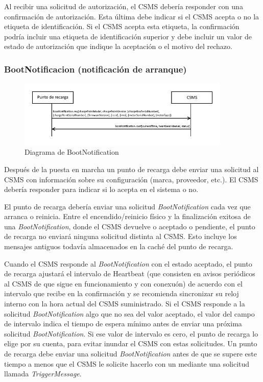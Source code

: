 \documentclass[12pt,a4paper,onecolumn,oneside]{report}
\begin{document}
Al recibir una solicitud de autorización, el CSMS debería responder con una confirmación de autorización. Esta última debe indicar si el CSMS acepta o no la etiqueta de identificación. Si el CSMS acepta esta etiqueta, la confirmación podría incluir una etiqueta de identificación superior y debe incluir un valor de estado de autorización que indique la aceptación o el motivo del rechazo.


\subsubsection{BootNotificacion (notificación de arranque)}
\label{BootNotificacion (notificación de arranque)}


\begin{figure}[H] 
\centering
  \includegraphics[width=0.9\textwidth]{figuras/diagramabootnotification.png}
  \caption[Diagrama de \textit{BootNotification}]{Diagrama de BootNotification\\
  }
  \label{fig:diagramabootnotification}
\end{figure}


Después de la puesta en marcha un punto de recarga debe enviar una solicitud al CSMS con información sobre su configuración (marca, proveedor, etc.). El CSMS debería responder para indicar si lo acepta en el sistema o no.

El punto de recarga debería enviar una solicitud \textit{BootNotification} cada vez que arranca o reinicia. Entre el encendido/reinicio físico y la finalización exitosa de una \textit{BootNotification}, donde el CSMS devuelve o aceptado o pendiente, el punto de recarga no enviará ninguna solicitud distinta al CSMS. Esto incluye los mensajes antiguos todavía almacenados en la caché del punto de recarga.

Cuando el CSMS responde al \textit{BootNotification} con el estado aceptado, el punto de recarga ajustará el intervalo de Heartbeat (que consisten en avisos periódicos al CSMS de que sigue en funcionamiento y con conexuón) de acuerdo con el intervalo que recibe en la confirmación y se recomienda sincronizar su reloj interno con la hora actual del CSMS suministrado. Si el CSMS responde a la solicitud \textit{BootNotification} algo que no sea del valor aceptado, el valor del campo de intervalo indica el tiempo de espera mínimo antes de enviar una próxima solicitud \textit{BootNotification}. Si ese valor de intervalo es cero, el punto de recarga lo elige por su cuenta, para evitar inundar el CSMS con estas solicitudes. Un punto de recarga debe enviar una solicitud \textit{BootNotification} antes de que se supere este tiempo a menos que el CSMS le solicite hacerlo con un mediante una solicitud llamada \textit{TriggerMessage}.
\end{document}
